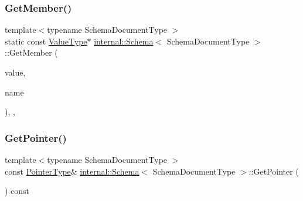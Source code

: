 \mbox{\label{classinternal_1_1Schema_aedf4000944036d010bf6eedcbcf7c8ae}} 
\subsubsection{\texorpdfstring{Get\+Member()}{GetMember()}}
{\footnotesize\ttfamily template$<$typename Schema\+Document\+Type $>$ \\
static const \hyperlink{classinternal_1_1Schema_a8976b6d7e2a885483d0b51d941019340}{Value\+Type}$\ast$ \hyperlink{classinternal_1_1Schema}{internal\+::\+Schema}$<$ Schema\+Document\+Type $>$\+::Get\+Member (\begin{DoxyParamCaption}\item[{const \hyperlink{classinternal_1_1Schema_a8976b6d7e2a885483d0b51d941019340}{Value\+Type} \&}]{value,  }\item[{const \hyperlink{classinternal_1_1Schema_a8976b6d7e2a885483d0b51d941019340}{Value\+Type} \&}]{name }\end{DoxyParamCaption})\hspace{0.3cm}{\ttfamily [inline]}, {\ttfamily [static]}, {\ttfamily [private]}}

\mbox{\label{classinternal_1_1Schema_a3854ebdf4d9d0b1b1c5dbcdb4439dca7}} 
\subsubsection{\texorpdfstring{Get\+Pointer()}{GetPointer()}}
{\footnotesize\ttfamily template$<$typename Schema\+Document\+Type $>$ \\
const \hyperlink{classinternal_1_1Schema_a13d7dbba6e4a77b10862546777c5aae8}{Pointer\+Type}\& \hyperlink{classinternal_1_1Schema}{internal\+::\+Schema}$<$ Schema\+Document\+Type $>$\+::Get\+Pointer (\begin{DoxyParamCaption}{ }\end{DoxyParamCaption}) const\hspace{0.3cm}{\ttfamily [inline]}}

\mbox{\label{classinternal_1_1Schema_a4a493e850ddc13776d09058bd5d74f58}} 
